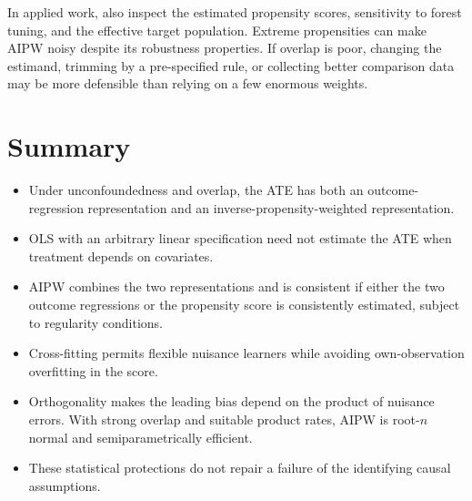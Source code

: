 In applied work, also inspect the estimated propensity scores, sensitivity to
forest tuning, and the effective target population.  Extreme propensities can make
AIPW noisy despite its robustness properties.  If overlap is poor, changing the
estimand, trimming by a pre-specified rule, or collecting better comparison data may
be more defensible than relying on a few enormous weights.

\section{Summary}

\begin{itemize}
  \item Under unconfoundedness and overlap, the ATE has both an outcome-regression
  representation and an inverse-propensity-weighted representation.
  \item OLS with an arbitrary linear specification need not estimate the ATE when
  treatment depends on covariates.
  \item AIPW combines the two representations and is consistent if either the two
  outcome regressions or the propensity score is consistently estimated, subject
  to regularity conditions.
  \item Cross-fitting permits flexible nuisance learners while avoiding
  own-observation overfitting in the score.
  \item Orthogonality makes the leading bias depend on the product of nuisance
  errors.  With strong overlap and suitable product rates, AIPW is root-$n$ normal
  and semiparametrically efficient.
  \item These statistical protections do not repair a failure of the identifying
  causal assumptions.
\end{itemize}
